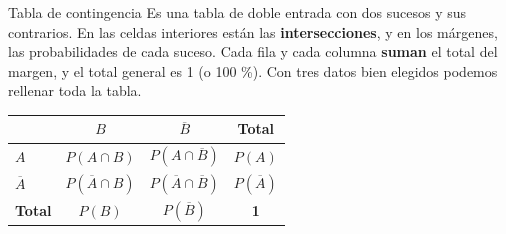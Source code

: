 \documentclass[11pt,a4paper]{article}
\begin{document}
  
\begin{fmdef}{Tabla de contingencia}
Es una tabla de doble entrada con dos sucesos y sus contrarios. En las celdas interiores están las \textbf{intersecciones}, y en los márgenes, las probabilidades de cada suceso. Cada fila y cada columna \textbf{suman} el total del margen, y el total general es 1 (o 100 \%). Con tres datos bien elegidos podemos rellenar toda la tabla.

      
\begin{center}\renewcommand{\arraystretch}{1.55}\setlength{\tabcolsep}{9pt}\begin{tabular}{l|cc|c}\toprule
\textbf{} & \textbf{$B$} & \textbf{$\overline{B}$} & \textbf{Total}\\\midrule
\textbf{$A$} & $P(A\cap B)$ & $P(A\cap\overline{B})$ & \textbf{$P(A)$}\\
\textbf{$\overline{A}$} & $P(\overline{A}\cap B)$ & $P(\overline{A}\cap\overline{B})$ & \textbf{$P(\overline{A})$}\\
\midrule\textbf{Total} & \textbf{$P(B)$} & \textbf{$P(\overline{B})$} & \textbf{1}\\
\bottomrule\end{tabular}\end{center}
\end{fmdef}
\end{document}
